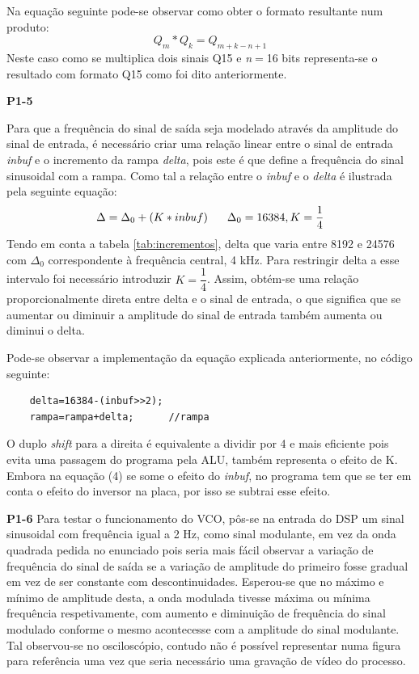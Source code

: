 \documentclass[11pt]{article}
\begin{document}
Na equação seguinte pode-se observar como obter o formato resultante num produto:
\begin{equation}
Q_{m} * Q_{k}=Q_{m+k-n+1}
\end{equation}
Neste caso como se multiplica dois sinais Q15 e \textit{n}$=$16 bits representa-se o resultado com formato Q15 como foi dito anteriormente. 
\vspace{2 mm}

\textbf{P1-5}
\label{para:P1-5}

Para que a frequência do sinal de saída seja modelado através da amplitude do sinal de entrada, é necessário criar uma relação linear entre o sinal de entrada \textit{inbuf} e o incremento da rampa \textit{delta}, pois este é que define a frequência do sinal sinusoidal com a rampa. Como tal a relação entre o \textit{inbuf} e o \textit{delta} é ilustrada pela seguinte equação:
\begin{equation}
	\Delta=\Delta_0+(K*inbuf)	\hspace{6 mm}\Delta_0=16384, K=\frac{1}{4}
\end{equation}
Tendo em conta a tabela \ref{tab:incrementos}, delta que varia entre 8192 e 24576 com $\Delta_0$ correspondente à frequência central, 4 kHz. Para restringir delta a esse intervalo foi necessário introduzir $K=\dfrac{1}{4}$. Assim, obtém-se uma relação proporcionalmente direta entre delta e o sinal de entrada, o que significa que se aumentar ou diminuir a amplitude do sinal de entrada também aumenta ou diminui o delta.

Pode-se observar a implementação da equação explicada anteriormente, no código seguinte:

\begin{lstlisting}
	delta=16384-(inbuf>>2); 
	rampa=rampa+delta;		//rampa
\end{lstlisting}
O duplo \textit{shift} para a direita é equivalente a dividir por 4 e mais eficiente pois evita uma passagem do programa pela ALU, também representa o efeito de K.
Embora na equação (4) se some o efeito do \textit{inbuf}, no programa tem que se ter em conta o efeito do inversor na placa, por isso se subtrai esse efeito.

\textbf{P1-6}
\label{para:P1-6}
Para testar o funcionamento do VCO, pôs-se na entrada do DSP um sinal sinusoidal com frequência igual a 2 Hz, como sinal modulante, em vez da onda quadrada pedida no enunciado pois seria mais fácil observar a variação de frequência do sinal de saída se a variação de amplitude do primeiro fosse gradual em vez de ser constante com descontinuidades. Esperou-se que no máximo e mínimo de amplitude desta, a onda modulada tivesse máxima ou mínima frequência respetivamente, com aumento e diminuição de frequência do sinal modulado conforme o mesmo acontecesse com a amplitude do sinal modulante. Tal observou-se no osciloscópio, contudo não é possível representar numa figura para referência uma vez que seria necessário uma gravação de vídeo do processo.
\end{document}

